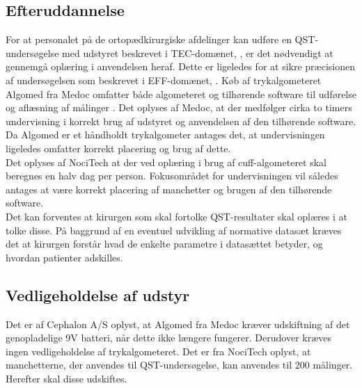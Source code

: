 \subsection{Efteruddannelse}
For at personalet på de ortopædkirurgiske afdelinger kan udføre en QST-undersøgelse med udstyret beskrevet i TEC-domænet, , er det nødvendigt at gennemgå oplæring i anvendelsen heraf. Dette er ligeledes for at sikre præcisionen af undersøgelsen som beskrevet i EFF-domænet, . Køb af trykalgometeret Algomed fra Medoc omfatter både algometeret og tilhørende software til udførelse og aflæsning af målinger \citep{AlgomedData}. Det oplyses af Medoc, at der medfølger cirka to timers undervisning i korrekt brug af udstyret og anvendelsen af den tilhørende software. Da Algomed er et håndholdt trykalgometer antages det, at undervisningen ligeledes omfatter korrekt placering og brug af dette. \\
Det oplyses af NociTech at der ved oplæring i brug af cuff-algometeret skal beregnes en halv dag per person. Fokusområdet for undervisningen vil således antages at være korrekt placering af manchetter og brugen af den tilhørende software.\\
Det kan forventes at kirurgen som skal fortolke QST-resultater skal oplæres i at tolke disse. På baggrund af en eventuel udvikling af normative datasæt kræves det at kirurgen forstår hvad de enkelte parametre i datasættet betyder, og hvordan patienter adskilles. 

\subsection{Vedligeholdelse af udstyr}
Det er af Cephalon A/S oplyst, at Algomed fra Medoc kræver udskiftning af det genopladelige 9V batteri, når dette ikke længere fungerer. Derudover kræves ingen vedligeholdelse af trykalgometeret.
Det er fra NociTech oplyst, at manchetterne, der anvendes til QST-undersøgelse, kan anvendes til 200 målinger. Herefter skal disse udskiftes.

